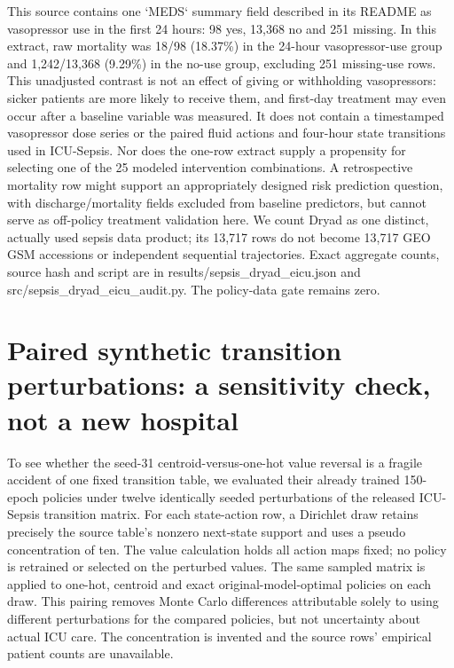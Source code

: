This source contains one `MEDS` summary field described in its README as vasopressor use in the first 24 hours: 98 yes, 13,368 no and 251 missing. In this extract, raw mortality was 18/98 (18.37\%) in the 24-hour vasopressor-use group and 1,242/13,368 (9.29\%) in the no-use group, excluding 251 missing-use rows. This unadjusted contrast is not an effect of giving or withholding vasopressors: sicker patients are more likely to receive them, and first-day treatment may even occur after a baseline variable was measured. It does not contain a timestamped vasopressor dose series or the paired fluid actions and four-hour state transitions used in ICU-Sepsis. Nor does the one-row extract supply a propensity for selecting one of the 25 modeled intervention combinations. A retrospective mortality row might support an appropriately designed risk prediction question, with discharge/mortality fields excluded from baseline predictors, but cannot serve as off-policy treatment validation here. We count Dryad as one distinct, actually used sepsis data product; its 13,717 rows do not become 13,717 GEO GSM accessions or independent sequential trajectories. Exact aggregate counts, source hash and script are in results/sepsis\_dryad\_eicu.json and src/sepsis\_dryad\_eicu\_audit.py. The policy-data gate remains zero.

\section{Paired synthetic transition perturbations: a sensitivity check, not a new hospital}
To see whether the seed-31 centroid-versus-one-hot value reversal is a fragile accident of one fixed transition table, we evaluated their already trained 150-epoch policies under twelve identically seeded perturbations of the released ICU-Sepsis transition matrix. For each state-action row, a Dirichlet draw retains precisely the source table's nonzero next-state support and uses a pseudo concentration of ten. The value calculation holds all action maps fixed; no policy is retrained or selected on the perturbed values. The same sampled matrix is applied to one-hot, centroid and exact original-model-optimal policies on each draw. This pairing removes Monte Carlo differences attributable solely to using different perturbations for the compared policies, but not uncertainty about actual ICU care. The concentration is invented and the source rows' empirical patient counts are unavailable.

